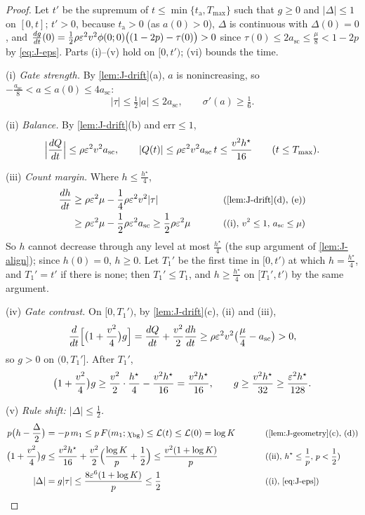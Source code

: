 \begin{proof}
Let $t'$ be the supremum of $t\le\min\{t_{\mathrm a},T_{\max}\}$ such that $g\ge0$ and $|\Delta|\le1$ on $[0,t]$; $t'>0$, because $t_{\mathrm a}>0$ (as $a(0)>0$), $\Delta$ is continuous with $\Delta(0)=0$, and
$\ddt{g}(0)=\frac{1}{2}\rho\initscale^2v^2\phi(0;0)\bigl((1-2p)-\tau(0)\bigr)>0$ since $\tau(0)\le2a_{\mathrm{sc}}\le\frac{\mu}{8}<1-2p$ by \cref{eq:J-eps}. Parts (i)--(v) hold on $[0,t')$; (vi) bounds the time.

\smallskip\noindent(i) \emph{Gate strength.} By \cref{lem:J-drift}(a), $a$ is nonincreasing, so $-\frac{a_{\mathrm{sc}}}{8}<a\le a(0)\le4a_{\mathrm{sc}}$:
\[
 |\tau|\le\tfrac{1}{2}|a|\le2a_{\mathrm{sc}},\qquad \sigma'(a)\ge\tfrac{1}{6}.
\]

\noindent(ii) \emph{Balance.} By \cref{lem:J-drift}(b) and $\mathrm{err}\le1$,
\[
 \Bigl|\ddt{Q}\Bigr|\le\rho\initscale^2v^2a_{\mathrm{sc}},\qquad |Q(t)|\le\rho\initscale^2v^2a_{\mathrm{sc}}\,t\le\frac{v^2h^\star}{16}\qquad(t\le T_{\max}).
\]

\noindent(iii) \emph{Count margin.} Where $h\le\frac{h^\star}{4}$,
\begin{alignat*}{2}
 \ddt{h}&\ge\rho\initscale^2\mu-\tfrac{1}{4}\rho\initscale^2v^2|\tau| &\qquad& \why{\cref{lem:J-drift}(d), (e)}\\
 &\ge\rho\initscale^2\mu-\tfrac{1}{2}\rho\initscale^2a_{\mathrm{sc}}\ge\tfrac{1}{2}\rho\initscale^2\mu && \why{(i), $v^2\le1$, $a_{\mathrm{sc}}\le\mu$}
\end{alignat*}
So $h$ cannot decrease through any level at most $\frac{h^\star}{4}$ (the sup argument of \cref{lem:J-align}); since $h(0)=0$, $h\ge0$.
Let $T_1'$ be the first time in $[0,t')$ at which $h=\frac{h^\star}{4}$, and $T_1'=t'$ if there is none; then $T_1'\le T_1$, and $h\ge\frac{h^\star}{4}$ on
$[T_1',t')$ by the same argument.

\noindent(iv) \emph{Gate contrast.} On $[0,T_1')$, by \cref{lem:J-drift}(c), (ii) and (iii),
\[
 \frac{d}{dt}\Bigl[\bigl(1+\tfrac{v^2}{4}\bigr)g\Bigr]=\ddt{Q}+\frac{v^2}{2}\ddt{h}\ge\rho\initscale^2v^2\bigl(\tfrac{\mu}{4}-a_{\mathrm{sc}}\bigr)>0,
\]
so $g>0$ on $(0,T_1']$. After $T_1'$,
\[
 \bigl(1+\tfrac{v^2}{4}\bigr)g\ge\frac{v^2}{2}\cdot\frac{h^\star}{4}-\frac{v^2h^\star}{16}=\frac{v^2h^\star}{16},\qquad g\ge\frac{v^2h^\star}{32}\ge\frac{\initscale^2h^\star}{128} .
\]

\noindent(v) \emph{Rule shift: $|\Delta|\le\frac{1}{2}$.}
\begin{alignat*}{2}
 p\bigl(h-\tfrac{\Delta}{2}\bigr)&=-p\,m_1\le p\,F(m_1;\cbg)\le\mathcal L(t)\le\mathcal L(0)=\log K &\qquad& \why{\cref{lem:J-geometry}(c), (d)}\\
 \bigl(1+\tfrac{v^2}{4}\bigr)g&\le\frac{v^2h^\star}{16}+\frac{v^2}{2}\Bigl(\frac{\log K}{p}+\frac{1}{2}\Bigr)\le\frac{v^2(1+\log K)}{p} && \why{(ii), $h^\star\le\tfrac{1}{p}$, $p<\tfrac{1}{2}$}\\
 |\Delta|&=g|\tau|\le\frac{8\initscale^6(1+\log K)}{p}\le\frac{1}{2} && \why{(i), \cref{eq:J-eps}}
\end{alignat*}


\end{proof}
